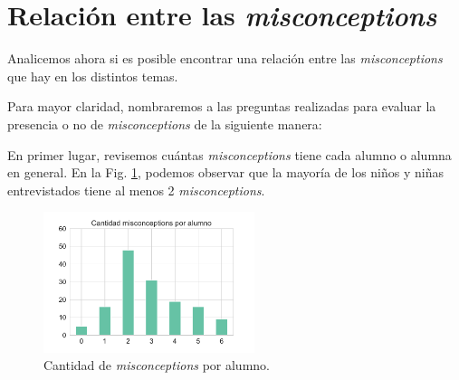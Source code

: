 \section{Relación entre las \textit{misconceptions}}

Analicemos ahora si es posible encontrar una relación entre las \textit{misconceptions} que hay en los distintos temas.

Para mayor claridad, nombraremos a las preguntas realizadas para evaluar la presencia o no de \textit{misconceptions} de la siguiente manera:

\begin{table}[h]
\centering
{}
\end{table}

En primer lugar,  revisemos cuántas \textit{misconceptions} tiene cada alumno o alumna en general. En la Fig. \ref{fig:analisis25}, podemos observar que la mayoría de los niños y niñas entrevistados tiene al menos 2 \textit{misconceptions}.

\begin{figure}[h]
    \centering
    \includegraphics[width=0.55\textwidth]{images_analisis/25.pdf}
    \caption{Cantidad de \textit{misconceptions} por alumno.}
    \label{fig:analisis25}
\end{figure}

